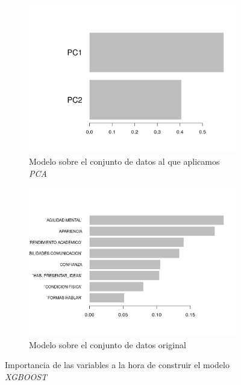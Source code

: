\documentclass[11pt]{article}
\begin{document}
\begin{figure}[H]
    \centering
    \begin{subfigure}{0.45\textwidth}
        \includegraphics[width=1.0\textwidth]{xgb_coeff_pca}
        \caption{Modelo sobre el conjunto de datos al que aplicamos \textit{PCA}}
    \end{subfigure}
    \begin{subfigure}{0.45\textwidth}
        \includegraphics[width=1.0\textwidth]{xgb_coeff_orig}
        \caption{Modelo sobre el conjunto de datos original}
    \end{subfigure}

    \caption{Importancia de las variables a la hora de construir el modelo \textit{XGBOOST}}
\end{figure}
\end{document}
